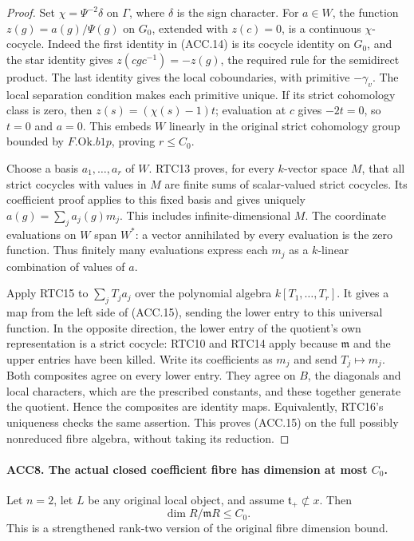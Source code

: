\documentclass[11pt,a4paper]{article}
\numberwithin{equation}{section}
\theoremstyle{remark}\newtheorem{remark}[theorem]{Remark}
\begin{document}
\begin{proof}
Set \(\chi=\Psi^{-2}\delta\) on \(\Gamma\), where
\(\delta\) is the sign character.  For \(a\in W\), the function
\(z(g)=a(g)/\Psi(g)\) on \(G_0\), extended with \(z(c)=0\),
is a continuous \(\chi\)-cocycle.  Indeed the first identity in
(ACC.14) is its cocycle identity on \(G_0\), and the star identity
gives \(z(cgc^{-1})=-z(g)\), the required rule for the semidirect
product.  The last identity gives the local coboundaries, with
primitive \(-\gamma_v\).  The local separation condition makes
each primitive unique.  If its strict cohomology class is zero,
then \(z(s)=(\chi(s)-1)t\); evaluation at \(c\) gives
\(-2t=0\), so \(t=0\) and \(a=0\).  This embeds \(W\)
linearly in the original strict cohomology group bounded by
\(F.\mathrm{Ok}.b1p\), proving \(r\le C_0\).

Choose a basis \(a_1,\ldots,a_r\) of \(W\).  RTC13 proves,
for every \(k\)-vector space \(M\), that all strict cocycles
with values in \(M\) are finite sums of scalar-valued strict
cocycles.  Its coefficient proof applies to this fixed basis and
gives uniquely \(a(g)=\sum_j a_j(g)m_j\).  This includes
infinite-dimensional \(M\).  The coordinate evaluations on
\(W\) span \(W^*\): a vector annihilated by every evaluation
is the zero function.  Thus finitely many evaluations express
each \(m_j\) as a \(k\)-linear combination of values of \(a\).

Apply RTC15 to \(\sum_j T_j a_j\) over the polynomial algebra
\(k[T_1,\ldots,T_r]\).  It gives a map from the left side of
(ACC.15), sending the lower entry to this universal function.
In the opposite direction, the lower entry of the quotient's own
representation is a strict cocycle: RTC10 and RTC14 apply because
\(\mathfrak m\) and the upper entries have been killed.  Write
its coefficients as \(m_j\) and send \(T_j\mapsto m_j\).
Both composites agree on every lower entry.  They agree on \(B\),
the diagonals and local characters, which are the prescribed
constants, and these together generate the quotient.  Hence the
composites are identity maps.  Equivalently, RTC16's uniqueness
checks the same assertion.  This proves (ACC.15) on the full
possibly nonreduced fibre algebra, without taking its reduction.
\end{proof}

\paragraph{ACC8. The actual closed coefficient fibre has dimension at most \(C_0\).}
\label{claim:ACC8}
Let \(n=2\), let \(L\) be any original local object, and assume
\(\mathfrak t_+\not\subset x\).  Then
\[
                         \dim R/\mathfrak mR\le C_0.
                                                               \tag{ACC.16}
\]
This is a strengthened rank-two version of the original fibre
dimension bound.
\end{document}
